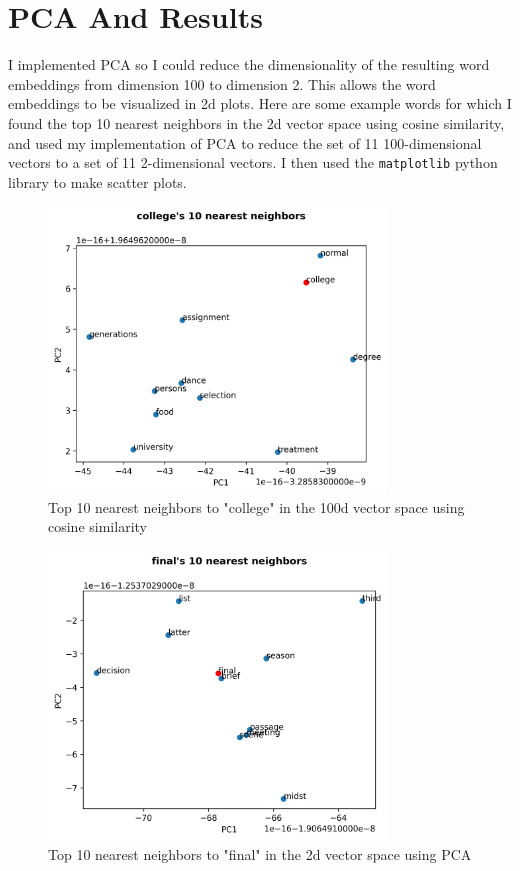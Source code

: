\documentclass[12pt,letterpaper]{article}
\begin{document}
\section{PCA And Results}
I implemented PCA so I could reduce the dimensionality of the resulting word embeddings from dimension 100 to dimension 2. This allows the word embeddings to be visualized in 2d plots. Here are some example words for which I found the top 10 nearest neighbors in the 2d vector space using cosine similarity, and used my implementation of PCA to reduce the set of 11 100-dimensional vectors to a set of 11 2-dimensional vectors. I then used the \texttt{matplotlib} python library to make scatter plots.
\begin{figure}[H]
\begin{center}
  \includegraphics[width=0.8\textwidth]{../graphs/college_neighbors.png}
\end{center}
\caption{Top 10 nearest neighbors to "college" in the 100d vector space using cosine similarity}
\end{figure}

\begin{figure}[H]
\begin{center}
  \includegraphics[width=0.8\textwidth]{../graphs/final_neighbors.png}
\end{center}
\caption{Top 10 nearest neighbors to "final" in the 2d vector space using PCA}
\end{figure}
\end{document}
